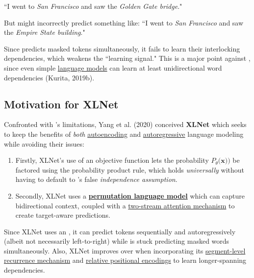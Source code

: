 ``I went to \emph{San Francisco} and saw the \emph{Golden Gate bridge}."

But  might incorrectly predict something like: ``I went to \emph{San Francisco} and saw the \emph{Empire State building}." 

Since  predicts masked tokens simultaneously, it fails to learn their interlocking dependencies, which weakens the ``learning signal." This is a major point against , since even simple \hyperref[sec:LanguageModels]{language models} can learn at least unidirectional word dependencies (Kurita, 2019b). 




\subsection{Motivation for XLNet}

Confronted with 's limitations, Yang et al. (2020) conceived \textbf{XLNet} which seeks to keep the benefits of \emph{both} \hyperref[sec:autoencodingLM]{autoencoding} and \hyperref[sec:autoregressiveLM]{autoregressive} language modeling while avoiding their issues: 

\begin{enumerate}
    \item Firstly, XLNet's use of an  objective function lets the probability $P_\theta(\textbf{x))}$ be factored using the probability product rule, which holds \emph{universally} without having to default to 's false \emph{independence assumption}. 
    
    \item  Secondly, XLNet uses a \textbf{\hyperref[sec:permutationLM]{permutation language model}} which can capture bidirectional context, coupled with a \hyperref[sec:TwoStreamSelfAttention]{two-stream attention mechanism} to create target-aware predictions. 
    
\end{enumerate}


Since XLNet uses an , it can predict tokens sequentially and autoregressively (albeit not necessarily left-to-right) while  is stuck predicting masked words simultaneously. Also, XLNet improves over  when incorporating its \hyperref[sec:SegmentLevelRec]{segment-level recurrence mechanism} and \hyperref[sec:RelativePosEnc]{relative positional encodings} to learn longer-spanning dependencies. 

